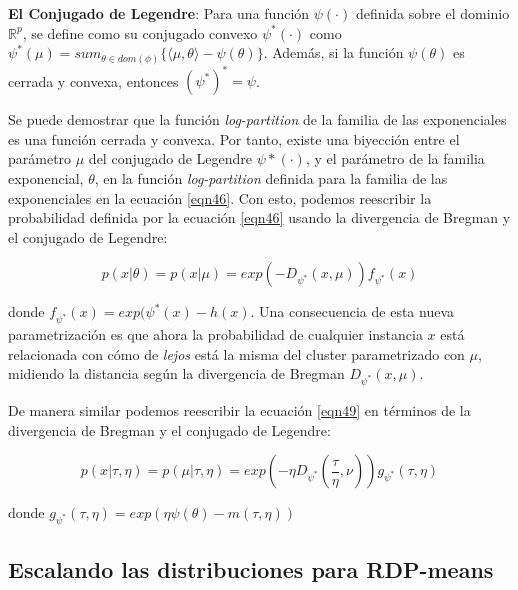 \begin{definicion}
	
	\textbf{El Conjugado de Legendre}: Para una función $\psi(\cdot)$ definida sobre el dominio $\mathbb{R}^p$, se define como su conjugado convexo $\psi^*(\cdot)$ como $\psi^*(\mu) = sum_{\theta \in dom(\phi)}\{\langle \mu, \theta \rangle - \psi(\theta) \}$. Además, si la función $\psi(\theta)$ es cerrada y convexa, entonces $(\psi^*)^* = \psi$. \cite{RDPM:2015}
	
\end{definicion}


Se puede demostrar que la función \textit{log-partition} de la familia de las exponenciales es una función cerrada y convexa. Por tanto, existe una biyección entre el parámetro $\mu$ del conjugado de Legendre $\psi*(\cdot)$, y el parámetro de la familia exponencial, $\theta$, en la función \textit{log-partition} definida para la familia de las exponenciales en la ecuación \ref{eqn46}. Con esto, podemos reescribir la probabilidad definida por la ecuación \ref{eqn46} usando la divergencia de Bregman y el conjugado de Legendre:

\begin{equation}
p(x|\theta) = p(x|\mu) = exp(-D_{\psi^*}(x, \mu)) f_{\psi^*}(x)
\label{eqn54}
\end{equation}

donde $f_{\psi^*}(x) = exp(\psi^*(x) - h(x)$. Una consecuencia de esta nueva parametrización es que ahora la probabilidad de cualquier instancia $x$ está relacionada con cómo de \textit{lejos} está la misma del cluster parametrizado con $\mu$, midiendo la distancia según la divergencia de Bregman $D_{\psi^*}(x, \mu)$.

De manera similar podemos reescribir la ecuación \ref{eqn49} en términos de la divergencia de Bregman y el conjugado de Legendre:

\begin{equation}
p(x|\tau, \eta) = p(\mu|\tau, \eta) = exp \left(-\eta D_{\psi^*}(\frac{\tau}{\eta}, \nu)\right) g_{\psi^*}(\tau, \eta)
\label{eqn55}
\end{equation}

donde $g_{\psi^*}(\tau, \eta) = exp(\eta \psi(\theta) - m(\tau, \eta))$

\subsection{Escalando las distribuciones para RDP-means}

